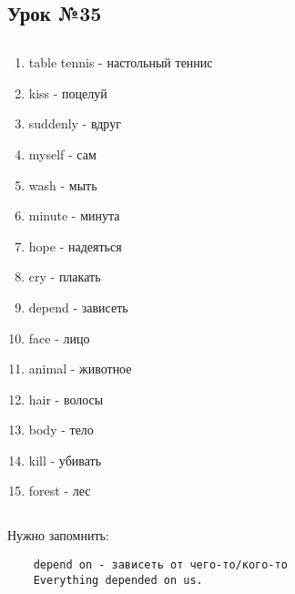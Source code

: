 \subsection{Урок №35}

\subsection*{}
\begin{multicols}{2}
    \begin{enumerate}\setlength{\itemsep}{0pt}
        \item table tennis - настольный теннис
        \item kiss - поцелуй
        \item suddenly - вдруг
        \item myself - сам
        \item wash - мыть
        \item minute - минута
        \item hope - надеяться
        \item cry - плакать
        \item depend - зависеть
        \item face - лицо
        \item animal - животное
        \item hair - волосы
        \item body - тело
        \item kill - убивать
        \item forest - лес
    \end{enumerate}
\end{multicols}

\subsection*{}
Нужно запомнить:
\begin{verbatim}
    depend on - зависеть от чего-то/кого-то
    Everything depended on us.
\end{verbatim}